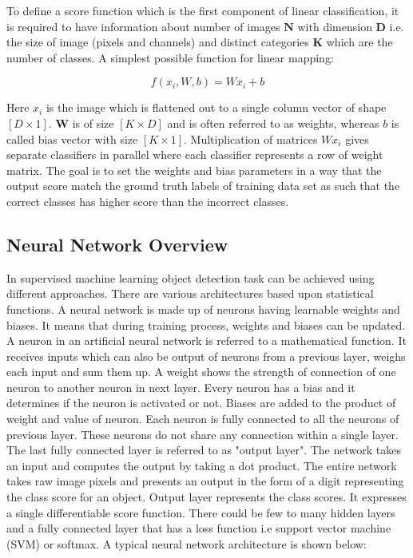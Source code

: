 \documentclass[11pt]{article}
\begin{document}
To define a score function which is the first component of linear classification, it is required to have information about number of images $\boldsymbol{N}$ with dimension  $\boldsymbol{D}$ i.e. the size of image (pixels and channels) and distinct categories $\boldsymbol{K}$ which are the number of classes. A simplest possible function for linear mapping:

$$
f(x_i, W, b) = Wx_i + b
$$

Here $x_i$ is the image which is flattened out to a single column vector of shape $[D \times 1]$. $\boldsymbol{W}$ is of size  $[K \times D]$ and is often referred to as weights, whereas $b$ is called bias vector with size  $[K \times 1]$. Multiplication of matrices $Wx_i$ gives separate classifiers in parallel where each classifier represents a row of weight matrix. The goal is to set the weights and bias parameters in a way that the output score match the ground truth labels of training data set as such that the correct classes has higher score than the incorrect classes.  

\subsection{Neural Network Overview}
In supervised machine learning object detection task can be achieved using different approaches. There are various architectures based upon statistical functions. A neural network is made up of neurons having learnable weights and biases. It means that during training process, weights and biases can be updated. A neuron in an artificial neural network is referred to a mathematical function. It receives inputs which can also be output of neurons from a previous layer, weighs each input and sum them up. A weight shows the strength of connection of one neuron to another neuron in next layer. Every neuron has a bias and it determines if the neuron is activated or not. Biases are added to the product of weight and value of neuron. Each neuron is fully connected to all the neurons of previous layer. These neurons do not share any connection within a single layer. The last fully connected layer is referred to as "output layer". The network takes an input and computes the output by taking a dot product. The entire network takes raw image pixels and presents an output in the form of a digit representing the class score for an object. Output layer represents the class scores. It expresses a single differentiable score function. There could be few to many hidden layers and a fully connected layer that has a loss function i.e support vector machine (SVM) or softmax. A typical neural network architecture is shown below:
\end{document}
